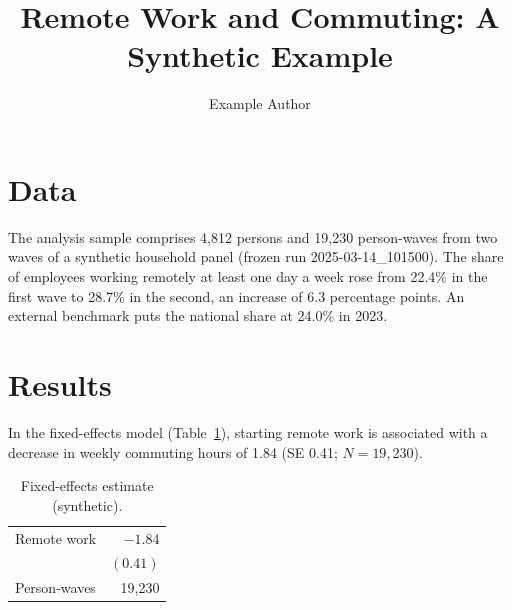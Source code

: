 \documentclass[11pt]{article}
\title{Remote Work and Commuting: A Synthetic Example}
\author{Example Author}
\date{}
\newcommand{\res}[2]{#2}
\newcommand{\ext}[2]{#2}
\begin{document}
\maketitle

\section{Data}\label{sec:data}

The analysis sample comprises \res{n_persons}{4,812} persons and
19,230 person-waves from two waves of a synthetic household panel
(frozen run 2025-03-14\_101500). The share of employees working remotely at
least one day a week rose from 22.4\% in the first wave to 28.7\% in the
second, an increase of \res{diff_share_w2_w1}{6.3} percentage points. An
external benchmark puts the national share at \ext{benchmark_remote_share}{24.0}\%
in 2023.

\section{Results}\label{sec:results}

In the fixed-effects model (Table~\ref{tab:fe}), starting remote work is
associated with a decrease in weekly commuting hours of
\res{coef_remote}{1.84} (SE 0.41; $N = 19{,}230$).

\begin{table}[h]
\centering
\caption{Fixed-effects estimate (synthetic).}\label{tab:fe}
\begin{tabular}{lr}
\hline
Remote work & $-1.84$ \\
 & $(0.41)$ \\
Person-waves & 19,230 \\
\hline
\end{tabular}
\end{table}
\end{document}
